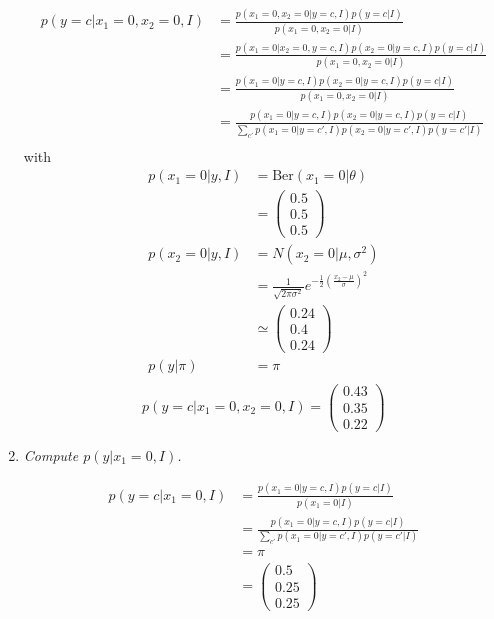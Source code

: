 \begin{example}
\begin{enumerate}
		\begin{equation}
			\begin{split}
				p(y=c|x_1=0,x_2=0,I) & = \frac{p(x_1=0,x_2=0|y=c,I)p(y=c|I)}{p(x_1=0,x_2=0|I)}\\
				&= \frac{p(x_1=0|x_2=0,y=c,I)p(x_2=0|y=c,I)p(y=c|I)}{p(x_1=0,x_2=0|I)}\\
				&= \frac{p(x_1=0|y=c,I)p(x_2=0|y=c,I)p(y=c|I)}{p(x_1=0,x_2=0|I)}\\
				&= \frac{p(x_1=0|y=c,I)p(x_2=0|y=c,I)p(y=c|I)}{\sum_{c'} p(x_1=0|y=c',I)p(x_2=0|y=c',I)p(y=c'|I)}\\
			\end{split}
		\end{equation}
		with
		\begin{equation}
			\begin{split}
				p(x_1=0|y,I) &= \text{Ber}(x_1=0|\theta)\\
				&= \begin{pmatrix}
					0.5 \\ 0.5\\ 0.5
				\end{pmatrix}\\
				p(x_2=0|y,I) &= N(x_2=0|\mu,\sigma^2)\\
				&= \frac{1}{\sqrt{2\pi \sigma^2}}e^{-\frac{1}{2}(\frac{x_2-\mu}{\sigma})^2}\\
				&\simeq  \begin{pmatrix}
					0.24 \\ 0.4\\ 0.24
				\end{pmatrix}\\
				p(y|\pi) &= \pi\\
			\end{split}
		\end{equation}
		\begin{equation}
			p(y=c|x_1=0,x_2=0,I) = \begin{pmatrix}
				0.43 \\ 0.35\\ 0.22
			\end{pmatrix}
		\end{equation}
		
		\item \emph{Compute $p(y|x_1=0,I)$.}
		
		\begin{equation}
			\begin{split}
				p(y=c|x_1=0,I) & = \frac{p(x_1=0|y=c,I)p(y=c|I)}{p(x_1=0|I)}\\
				&= \frac{p(x_1=0|y=c,I)p(y=c|I)}{\sum_{c'}p(x_1=0|y=c',I)p(y=c'|I)}\\
				&= \pi\\
				& = \begin{pmatrix}
					0.5 \\ 0.25\\ 0.25
				\end{pmatrix}
			\end{split}
		\end{equation}
		

\end{enumerate}
\end{example}
